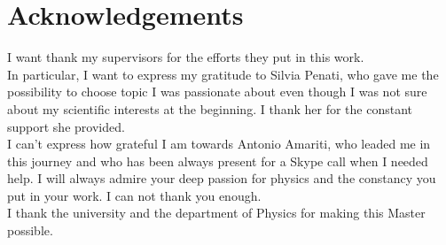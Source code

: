 

\chapter*{Acknowledgements}

I want thank my supervisors for the efforts they put in this work.\\
In particular, I want to express my gratitude to Silvia Penati, who gave me the possibility to choose topic I was passionate about even though I was not sure about my scientific interests at the beginning. 
I thank her for the constant support she provided.
\\
I can't express how grateful I am towards Antonio Amariti, who leaded me in this journey and who has been always present for a Skype call when I needed help.
I will always admire your deep passion for physics and the constancy you put in your work.  I can not thank you enough.
\\
I thank the university and the department of Physics for making this Master possible.

